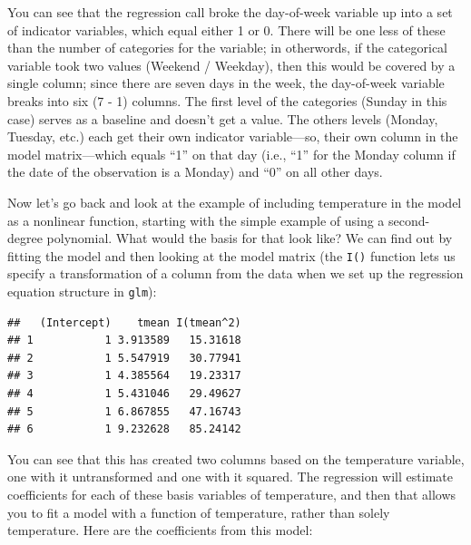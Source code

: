 \documentclass[
]{book}
\newenvironment{Shaded}{\begin{snugshade}}{\end{snugshade}}
\newcommand{\DataTypeTok}[1]{\textcolor[rgb]{0.13,0.29,0.53}{#1}}
\newcommand{\DecValTok}[1]{\textcolor[rgb]{0.00,0.00,0.81}{#1}}
\newcommand{\KeywordTok}[1]{\textcolor[rgb]{0.13,0.29,0.53}{\textbf{#1}}}
\newcommand{\NormalTok}[1]{#1}
\newcommand{\OperatorTok}[1]{\textcolor[rgb]{0.81,0.36,0.00}{\textbf{#1}}}
\newcommand{\StringTok}[1]{\textcolor[rgb]{0.31,0.60,0.02}{#1}}
\begin{document}
You can see that the regression call broke the day-of-week variable up into a set of indicator variables, which
equal either 1 or 0. There will be one less of these than the number of categories for the
variable; in otherwords, if the categorical variable took two values (Weekend / Weekday), then
this would be covered by a single column; since there are seven days in the week, the
day-of-week variable breaks into six (7 - 1) columns. The first level of the categories
(Sunday in this case) serves as a baseline and doesn't get a value. The others levels
(Monday, Tuesday, etc.) each get their own indicator variable---so, their own column in
the model matrix---which equals ``1'' on that day (i.e., ``1'' for the Monday column if the date
of the observation is a Monday) and ``0'' on all other days.

Now let's go back and look at the example of including temperature in the model as a nonlinear
function, starting with the simple example of using a second-degree polynomial. What would
the basis for that look like? We can find out by fitting the model and then looking at the
model matrix (the \texttt{I()} function lets us specify a transformation of a column from the
data when we set up the regression equation structure in \texttt{glm}):

\begin{Shaded}
\end{Shaded}

\begin{verbatim}
##   (Intercept)    tmean I(tmean^2)
## 1           1 3.913589   15.31618
## 2           1 5.547919   30.77941
## 3           1 4.385564   19.23317
## 4           1 5.431046   29.49627
## 5           1 6.867855   47.16743
## 6           1 9.232628   85.24142
\end{verbatim}

You can see that this has created two columns based on the temperature variable, one with
it untransformed and one with it squared. The regression will estimate coefficients for each
of these basis variables of temperature, and then that allows you to fit a model with a
function of temperature, rather than solely temperature. Here are the coefficients from
this model:
\end{document}
